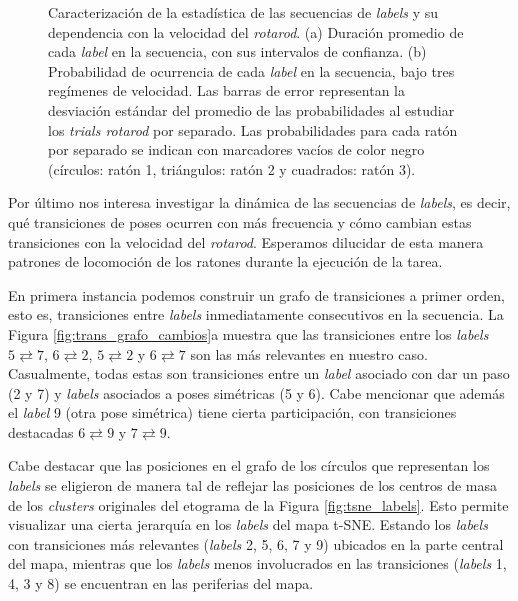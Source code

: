 \begin{figure}[!htbp]
\begin{subfigure}{.49\textwidth}
        \caption{}
    \end{subfigure}
    \caption{Caracterización de la estadística de las secuencias de \textit{labels} y su dependencia con la velocidad del \textit{rotarod}. (a) Duración promedio de cada \textit{label} en la secuencia, con sus intervalos de confianza. (b) Probabilidad de ocurrencia de cada \textit{label} en la secuencia, bajo tres regímenes de velocidad. Las barras de error representan la desviación estándar del promedio  de las probabilidades al estudiar los \textit{trials rotarod} por separado. Las probabilidades para cada ratón por separado se indican con marcadores vacíos de color negro (círculos: ratón 1, triángulos: ratón 2 y cuadrados: ratón 3). }
    \label{fig:hist_duracion}
\end{figure}

Por último nos interesa investigar la dinámica de las secuencias de \textit{labels}, es decir, qué transiciones de poses ocurren con más frecuencia y cómo cambian estas transiciones con la velocidad del \textit{rotarod}. Esperamos dilucidar de esta manera patrones de locomoción de los ratones durante la ejecución de la tarea.

En primera instancia podemos construir un grafo de transiciones a primer orden, esto es, transiciones entre \textit{labels} inmediatamente consecutivos en la secuencia.  La Figura \ref{fig:trans_grafo_cambios}a muestra que las transiciones entre los \textit{labels} $5 \rightleftarrows 7$, $6 \rightleftarrows 2$, $5 \rightleftarrows 2$ y $6 \rightleftarrows 7$ son las más relevantes en nuestro caso. Casualmente, todas estas son transiciones entre un \textit{label} asociado con dar un paso (2 y 7) y \textit{labels} asociados a poses simétricas (5 y 6). Cabe mencionar que además el \textit{label} 9 (otra pose simétrica) tiene cierta participación, con transiciones destacadas $6 \rightleftarrows 9$ y $7 \rightleftarrows 9$.

Cabe destacar que las posiciones en el grafo de los círculos que representan los \textit{labels} se eligieron de manera tal de reflejar las posiciones de los centros de masa de los \textit{clusters} originales del etograma de la Figura \ref{fig:tsne_labels}. Esto permite visualizar una cierta jerarquía en los \textit{labels} del mapa t-SNE.  Estando los \textit{labels} con transiciones más relevantes (\textit{labels} 2, 5, 6, 7 y 9) ubicados en la parte central del mapa, mientras que los \textit{labels} menos involucrados en las transiciones (\textit{labels} 1, 4, 3 y 8) se encuentran en las periferias del mapa.

